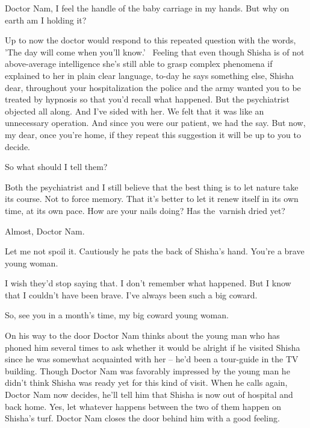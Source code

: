 \documentclass[letterpaper]{article}
\begin{document}
{\textquotedbl}Doctor Nam, I feel the handle of the baby carriage in my hands. But why on earth am I holding
it?{\textquotedbl} 

Up to now the doctor would respond to this repeated question with the words, 'The day will come when you'll know.'
~Feeling that even though Shisha is of not above\textcolor[rgb]{0.0,0.4392157,0.7529412}{{}-}average intelligence she's
still able to grasp complex phenomena if explained to her in plain clear language, to-day he says something else,
{\textquotedbl}Shisha dear, throughout your hospitalization the police and the army wanted you to be treated by
hypnosis so that you'd recall what happened. But the psychiatrist objected all along. And I've sided with her. We felt
that it was like an unnecessary operation. And since you were our patient, we had the say. But now, my dear, once
you're home, if they repeat this suggestion it will be up to you to decide.{\textquotedbl} 

{\textquotedbl}So what should I tell them?{\textquotedbl} 

{\textquotedbl}Both the psychiatrist and I still believe that the best thing is to let nature take its course. Not to
force memory. That it's better to let it renew itself in its own time, at its own pace. How are your nails doing? Has
the~varnish dried yet?{\textquotedbl} 

{\textquotedbl}Almost, Doctor Nam.{\textquotedbl} 

{\textquotedbl}Let me not spoil it.{\textquotedbl} Cautiously he pats the back of Shisha's hand. {\textquotedbl}You're a
brave young woman.{\textquotedbl} 

{\textquotedbl}I wish they'd stop saying that. I don't remember what happened. But I know that I couldn't have been
brave. I've always been such a big coward.{\textquotedbl} 

{\textquotedbl}So, see you in a month's time, my big coward young woman.{\textquotedbl}

On his way to the door Doctor Nam thinks about the young man who has phoned him several times to ask whether it would be
alright if he visited Shisha since he was somewhat acquainted with her -- he'd been a tour-guide in the TV building.
Though Doctor Nam was favorably impressed by the young man he didn't think Shisha was ready yet for this kind of visit.
When he calls again, Doctor Nam now decides, he'll tell him that Shisha is now out of hospital and back home. Yes, let
whatever happens between the two of them happen on Shisha's turf. Doctor Nam closes the door behind him with a good
feeling.
\end{document}
